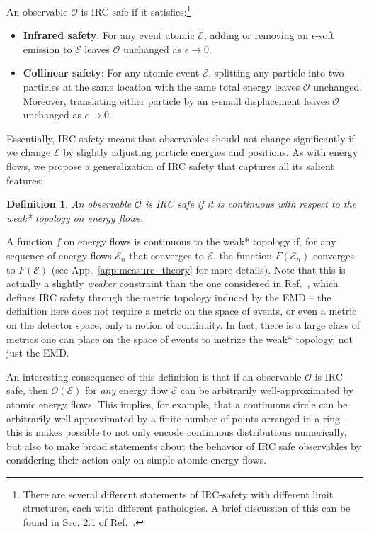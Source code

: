 \documentclass[letterpaper,11pt]{article}
\newcommand{\E}{\mathcal{E}}
\renewcommand{\O}{\mathcal{O}}
\DeclareRobustCommand{\App}[1]{App.~\ref{app:#1}}
\DeclareRobustCommand{\Refer}[1]{Ref.~\cite{#1}}
\newtheorem{definition}{Definition}
\begin{document}
An observable $\mathcal{O}$ is IRC safe if it satisfies:\footnote{There are several different statements of IRC-safety with different limit structures, each with different pathologies. A brief discussion of this can be found in Sec. 2.1 of \Refer{2020}.}
%
\begin{itemize}
    \item \textbf{Infrared safety}: For any event atomic $\E$, adding or removing an $\epsilon$-soft emission to $\E$ leaves $\O$ unchanged as $\epsilon\to0$.
    \item \textbf{Collinear safety}: For any atomic event $\E$, splitting any particle into two particles at the same location with the same total energy leaves $\O$ unchanged. Moreover, translating either particle by an $\epsilon$-small displacement leaves $\O$ unchanged as $\epsilon\to 0$.
\end{itemize}
%
Essentially, IRC safety means that observables should not change significantly if we change $\E$ by slightly adjusting particle energies and positions.
%
As with energy flows, we propose a generalization of IRC safety that captures all its salient features:
%
\begin{definition}
An observable $\O$ is IRC safe if it is continuous with respect to the weak* topology on energy flows.
\end{definition}
%
A function $f$ on energy flows is continuous to the weak* topology if, for any sequence of energy flows $\E_n$ that converges to $\E$, the function $F(\E_n)$ converges to $F(\E)$ (see \App{measure_theory} for more details). Note that this is actually a slightly \emph{weaker} constraint than the one considered in \Refer{2020}, which defines IRC safety through the metric topology induced by the EMD -- the definition here does not require a metric on the space of events, or even a metric on the detector space, only a notion of continuity. In fact, there is a large class of metrics one can place on the space of events to metrize the weak* topology, not just the EMD. 

An interesting consequence of this definition is that if an observable $\O$ is IRC safe, then $\O(\E)$ for \emph{any} energy flow $\E$ can be arbitrarily well-approximated by atomic energy flows. This implies, for example, that a continuous circle can be arbitrarily well approximated by a finite number of points arranged in a ring -- this is makes possible to not only encode continuous distributions numerically, but also to make broad statements about the behavior of IRC safe observables by considering their action only on simple atomic energy flows.
\end{document}
